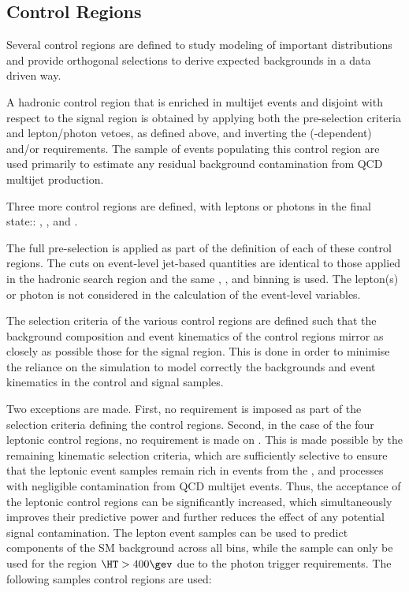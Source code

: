 \subsection{Control Regions}

Several control regions are defined to study modeling of important distributions and provide
orthogonal selections to derive expected backgrounds in a data driven way.


A hadronic control region that is enriched in multijet events and
disjoint with respect to the signal region is obtained by applying both the pre-selection criteria and lepton/photon vetoes, as defined
above, and inverting the (\HT-dependent) \alphat and/or \mhtmet requirements. 
The sample of events populating this control region are used primarily to estimate any residual background contamination from QCD multijet production.

Three more control regions are defined, with leptons or photons in the final state:: \mj, \mmj, and \gj. 

The full pre-selection is applied as part of the definition of each of these control regions. The cuts on event-level jet-based quantities are identical to
those applied in the hadronic search region and the same \njet, \nb, and \scalht binning is used. The lepton(s) or photon is not considered
in the calculation of the event-level variables.

The selection criteria of the various control regions are defined such that the background composition and event kinematics of the control
regions mirror as closely as possible those for the signal region. This is done in order to minimise the reliance on the simulation to model correctly the backgrounds and event kinematics in
the control and signal samples.

Two exceptions are made. First, no \bdphi requirement is imposed as part of the selection criteria defining the control regions. Second,
in the case of the four leptonic control regions, no requirement is made on \alphat. This is made possible by the remaining kinematic
selection criteria, which are sufficiently selective to ensure that the leptonic event samples remain rich in events from the \wj, \ttbar
and \zll processes with negligible contamination from QCD multijet events. Thus, the acceptance of the leptonic control regions can be
significantly increased, which simultaneously improves their predictive power and further reduces the effect of any potential
signal contamination.
The lepton event samples can be used to predict components of the SM background across all \scalht bins, while the \gj sample can only be
used for the region $\HT > 400\gev$ due to the photon trigger requirements. The following samples control regions are used:

